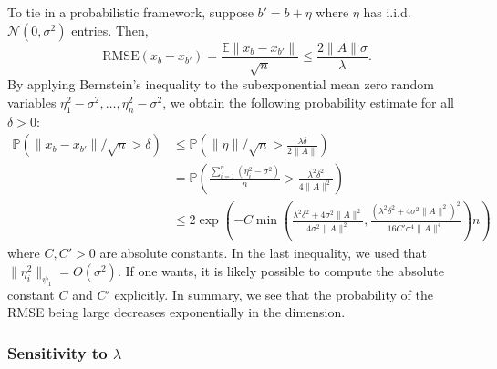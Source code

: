 \documentclass[10pt,a4paper]{article}
\numberwithin{equation}{section}
\theoremstyle{definition}
\def\ee{{\mathbb E}}
\def\P{{\mathbb P}}
\begin{document}
To tie in a probabilistic framework, suppose $b' = b + \eta$ where $\eta$ has i.i.d. $\mathcal{N}(0,\sigma^2)$ entries. Then, 
\[
 \text{RMSE}( x_b - x_{b'}) = \frac{\ee \lVert x_b - x_{b'}\rVert}{\sqrt{n}} \leq \frac{2 \lVert A \rVert \sigma}{\lambda}.
\]
By applying Bernstein's inequality \cite[Corollary 2.8.3]{Vershynin_2018} to the subexponential mean zero random variables $\eta_1^2 - \sigma^2, \dots, \eta_n^2 - \sigma^2$, we obtain the following probability estimate for all $\delta > 0$:
\begin{align*}
    \P( \lVert x_b - x_{b'} \rVert / \sqrt{n} > \delta) &\leq   \P \left( \lVert \eta \rVert / \sqrt{n} > \frac{\lambda\delta}{2 \lVert A \rVert} \right) \\
     &=  \P \left( \frac{\sum_{i=1}^n (\eta_i^2 - \sigma^2)}{n} > \frac{\lambda^2\delta^2}{4 \lVert A \rVert^2} \right) \\
     &\leq 2 \exp{\left(-C \min \left(\frac{\lambda^2\delta^2 + 4\sigma^2 \lVert A \rVert^2}{4\sigma^2 \lVert A \rVert^2}, \frac{(\lambda^2\delta^2 + 4\sigma^2 \lVert A \rVert^2)^2}{16 C'\sigma^4 \lVert A \rVert^4} \right)n\right)}
\end{align*}
where $C, C' > 0$ are absolute constants. In the last inequality, we used that $\lVert \eta_i^2 \rVert_{\psi_1} = O(\sigma^2)$. If one wants, it is likely possible to compute the absolute constant $C$ and $C'$ explicitly. In summary, we see that the probability of the RMSE being large decreases exponentially in the dimension. 

\subsubsection{Sensitivity to $\lambda$}
\end{document}
